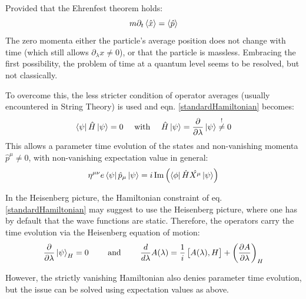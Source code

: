 \documentclass[twoside,a4paper,11pt]{article}
\numberwithin{equation}{section}
\begin{document}
Provided that the Ehrenfest theorem holds:
\begin{equation}
m \partial_t \braket{\hat{x}} = \braket{\hat{p}}
\end{equation}
The zero momenta either the particle's average position does not change with time (which still allows $\partial_\lambda x \neq 0$), or that the particle is massless. Embracing the first possibility, the problem of time at a quantum level seems to be resolved, but not classically.


To overcome this, the less stricter condition of operator averages (usually encountered in String Theory) is used and eqn. \ref{standardHamiltonian} becomes:
\begin{equation}
    \bra{\psi} \hat{H} \ket{\psi} = 0 \quad \text{ with } \quad \hat{H} \ket{\psi} = \frac{\partial}{\partial \lambda} \ket{\psi} \stackrel{!}{\neq} 0
\end{equation}
This allows a parameter time evolution of the states and non-vanishing momenta $\hat{p}^\mu \neq 0$, with non-vanishing expectation value in general:
\begin{equation}
\eta^{\mu\nu} e \bra{\psi} \hat{p}_\mu \ket{\psi}= i \operatorname{Im} \left( \bra{\phi} \hat{H} \hat{X^\mu} \ket{\psi} \right) 
\end{equation}


In the Heisenberg picture, the Hamiltonian constraint of eq. \ref{standardHamiltonian} may suggest to use the Heisenberg picture, where one has by default that the wave functions are static. Therefore, the operators carry the time evolution via the Heisenberg equation of motion:
\begin{equation}
    \frac{\partial}{\partial \lambda} \ket{\psi}_H =0  \qquad \text{ and } \qquad \frac{d}{d\lambda}A(\lambda) = \frac{1}{i } \left[A(\lambda), H\right] + \left(\frac{\partial A}{\partial \lambda} \right)_H
    \label{heisenbergpicture}
\end{equation}

However, the strictly vanishing Hamiltonian also denies parameter time evolution, but the issue can be solved using expectation values as above.

\newpage

\end{document}
